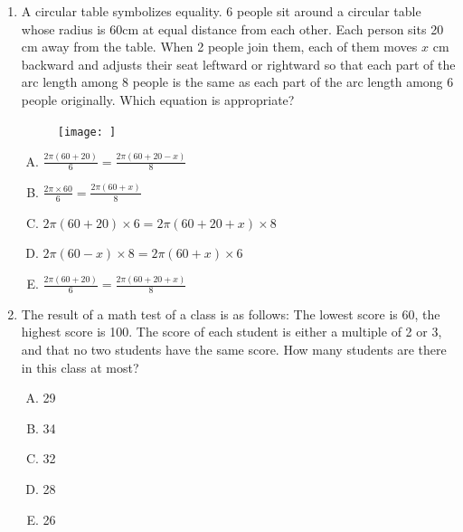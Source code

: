 \documentclass[12pt]{scrartcl}
\begin{document}
\begin{enumerate}
    \item A circular table symbolizes equality. 6 people sit around a circular table whose radius is 60cm at equal distance from each other. Each person sits 20 cm away from the table. When 2 people join them, each of them moves $x$ cm backward and adjusts their seat leftward or rightward so that each part of the arc length among 8 people is the same as each part of the arc length among 6 people originally. Which equation is appropriate?
    \begin{figure}[h]
        \centering
        \texttt{[image: ]}
    \end{figure}
    \begin{multicols}{5}
        \begin{enumerate}[(A)]
            \item $\frac{2\pi(60+20)}{6} = \frac{2\pi(60+20-x)}{8}$
            \item $\frac{2\pi \times 60}{6} = \frac{2\pi(60+x)}{8}$
            \item $2\pi(60+20) \times 6 = 2\pi(60+20+x) \times 8$
            \item $2\pi(60-x) \times 8 = 2\pi(60+x) \times 6$
            \item $\frac{2\pi(60+20)}{6} = \frac{2\pi(60+20+x)}{8}$
        \end{enumerate}
    \end{multicols}

    \item The result of a math test of a class is as follows: The lowest score is 60, the highest score is 100. The score of each student is either a multiple of 2 or 3, and that no two students have the same score. How many students are there in this class at most?
    \begin{multicols}{5}
        \begin{enumerate}[(A)]
            \item 29
            \item 34
            \item 32
            \item 28
            \item 26
        \end{enumerate}
    \end{multicols}


\end{enumerate}
\end{document}
